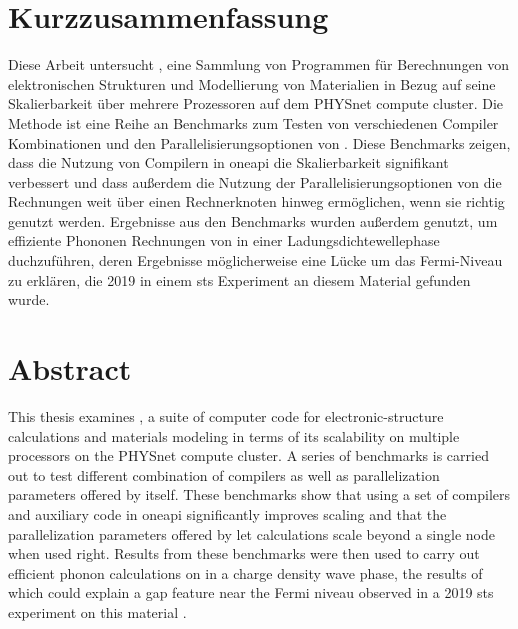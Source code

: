 \documentclass[main.tex]{subfiles}
\begin{document}
\section*{Kurzzusammenfassung}

Diese Arbeit untersucht \QE, eine Sammlung von Programmen für Berechnungen von elektronischen Strukturen und Modellierung von Materialien in Bezug auf seine Skalierbarkeit über mehrere Prozessoren auf dem PHYSnet compute cluster.
Die Methode ist eine Reihe an Benchmarks zum Testen von verschiedenen Compiler Kombinationen und den Parallelisierungsoptionen von \QE.
Diese Benchmarks zeigen, dass die Nutzung von Compilern in \gls{oneapi} die Skalierbarkeit signifikant verbessert und dass außerdem die Nutzung der Parallelisierungsoptionen von \QE die Rechnungen weit über einen Rechnerknoten hinweg ermöglichen, wenn sie richtig genutzt werden.
Ergebnisse aus den Benchmarks wurden außerdem genutzt, um effiziente Phononen Rechnungen von \TaS in einer Ladungsdichtewellephase duchzuführen, deren Ergebnisse möglicherweise eine Lücke um das Fermi-Niveau zu erklären, die 2019 in einem \gls{sts} Experiment an diesem Material \cite{hall_environmental_2019} gefunden wurde.

\section*{Abstract}

This thesis examines \QE, a suite of computer code for electronic-structure calculations and materials modeling in terms of its scalability on multiple processors on the PHYSnet compute cluster.
A series of benchmarks is carried out to test different combination of compilers as well as parallelization parameters offered by \QE itself.
These benchmarks show that using a set of compilers and auxiliary code in \gls{oneapi} significantly improves scaling and that the parallelization parameters offered by \QE let calculations scale beyond a single node when used right.
Results from these benchmarks were then used to carry out efficient phonon calculations on \TaS in a charge density wave phase, the results of which could explain a gap feature near the Fermi niveau observed in a 2019 \gls{sts} experiment on this material \cite{hall_environmental_2019}.
\end{document}
